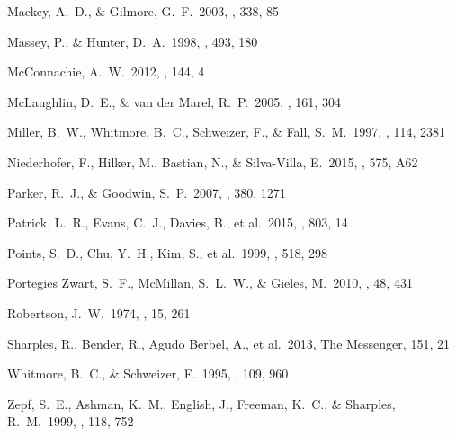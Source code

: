 \documentclass[useAMS,usenatbib]{mn2e}
\begin{document}
\begin{thebibliography}{99}
 Mackey, A.~D., \& Gilmore, G.~F.\ 2003, \mnras, 338, 85

 Massey, P., \& Hunter, D.~A.\ 1998, \apj, 493, 180

 McConnachie, A.~W.\ 2012,
\aj, 144, 4

 McLaughlin, D.~E., \& van der Marel, R.~P.\ 2005, \apjs, 161, 304

 Miller, B.~W., Whitmore,
B.~C., Schweizer, F., \& Fall, S.~M.\ 1997, \aj, 114, 2381

 Niederhofer, F., Hilker, M., Bastian, N., \& Silva-Villa, E.\ 2015, \aap, 575, A62

 Parker, R.~J., \& Goodwin, S.~P.\ 2007, \mnras, 380, 1271

 Patrick, L.~R., Evans,
C.~J., Davies, B., et al.\ 2015, \apj, 803, 14

 Points, S.~D., Chu,
Y.~H., Kim, S., et al.\ 1999, \apj, 518, 298

 Portegies Zwart, S.~F., McMillan, S.~L.~W., \& Gieles, M.\ 2010, \araa, 48, 431

 Robertson, J.~W.\ 1974, \aaps, 15, 261


 Sharples, R., Bender,
R., Agudo Berbel, A., et al.\ 2013, The Messenger, 151, 21


 Whitmore, B.~C., \& Schweizer, F.\ 1995, \aj, 109, 960

 Zepf, S.~E., Ashman,
K.~M., English, J., Freeman, K.~C., \& Sharples, R.~M.\ 1999, \aj, 118, 752
\end{thebibliography}
\label{lastpage}
\end{document}
